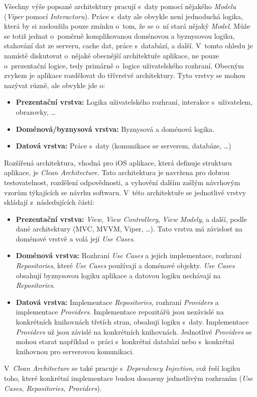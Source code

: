 Všechny výše popsané architektury pracují s~daty pomocí nějakého \emph{Modelu} (\emph{Viper} pomocí \emph{Interactoru}). Práce s~daty ale obvykle není jednoduchá logika, která by si zasloužila pouze zmínku o~tom, že se o~ní stará nějaký \emph{Model}. Může se totiž jednat o~poměrně komplikovanou doménovou a byznysovou logiku, stahování dat ze serveru, cache dat, práce s~databází, a další. V~tomto ohledu je namístě diskutovat o~nějaké obecnější architektuře aplikace, ne pouze o~prezentační logice, tedy primárně o~logice uživatelského rozhraní. Obecným zvykem je aplikace rozdělovat do třívrstvé architektury. Tyto vrstvy se mohou nazývat různě, ale obvykle jde o:
\begin{itemize}
\item\textbf{Prezentační vrstva:} Logika uživatelského rozhraní, interakce s~uživatelem, obrazovky, \dots
\item\textbf{Doménová/byznysová vrstva:} Byznysová a doménová logika.
\item\textbf{Datová vrstva:} Práce s~daty (komunikace se serverem, databáze, \dots)
\end{itemize}
Rozšířená architektura, vhodná pro iOS aplikace, která definuje strukturu aplikace, je \emph{Clean Architecture}. Tato architektura je navržena pro dobrou testovatelnost, rozdělení odpovědnosti, a vyhovění dalším zašlým návrhovým vzorům týkajících se návrhu softwaru. V~této architektuře se jednotlivé vrstvy skládají z~následujících částí:
\begin{itemize}
\item\textbf{Prezentační vrstva:} \emph{View}, \emph{View Controllery}, \emph{View Modely}, a další, podle dané architektury (MVC, MVVM, Viper, \dots). Tato vrstva má závislost na doménové vrstvě a volá její \emph{Use Cases}.
\item\textbf{Doménová vrstva:} Rozhraní \emph{Use Cases} a jejich implementace, rozhraní \emph{Repositories}, které \emph{Use Cases} používají a doménové objekty. \emph{Use Cases} obsahují byznysovou logiku aplikace a datovou logiku nechávají na \emph{Repositories}.
\item\textbf{Datová vrstva:} Implementace \emph{Repositories}, rozhraní \emph{Providers} a implementace \emph{Providers}. Implementace repozitářů jsou nezávislé na konkrétních knihovnách třetích stran, obsahují logiku s~daty. Implementace \emph{Providers} už jsou závislé na konkrétních knihovnách. Jednotlivé \emph{Providers} se mohou starat například o~práci s~konkrétní databází nebo s~konkrétní knihovnou pro serverovou komunikaci.
\end{itemize}
V~\emph{Clean Architecture} se také pracuje s~\emph{Dependency Injection}, což řeší logiku toho, které konkrétní implementace budou dosazeny jednotlivým rozhraním (\emph{Use Cases, Repositories, Providers}). \cite{ios-clean-arch-mvvm}

